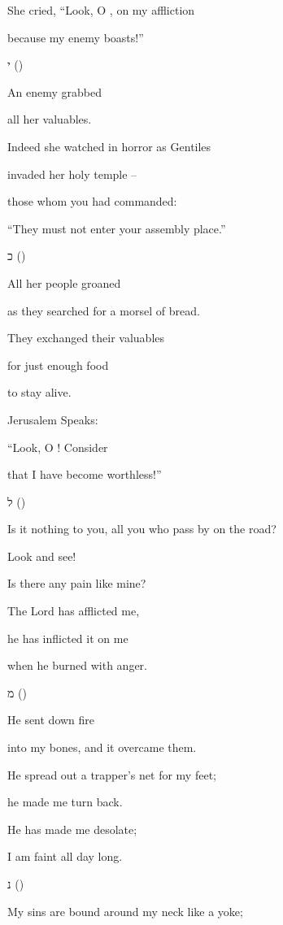 {\par }{\Q She cried, “Look, O
{}, on my affliction
\par }{\Q because my enemy boasts!”
\par }{\SH י ({})
\par }{\Q {}An enemy grabbed
\par }{\Q all her valuables.
\par }{\Q Indeed she watched in horror as Gentiles
\par }{\Q invaded her holy temple –
\par }{\Q those whom you had commanded:
\par }{\Q “They must not enter your assembly place.”
\par }{\SH כ ({})
\par }{\Q {}All her people groaned
\par }{\Q as they searched for a morsel of bread.
\par }{\Q They exchanged their valuables
\par }{\Q for just enough food
\par }{\Q to stay alive.
\par }{\SH Jerusalem Speaks:
\par }{\Q “Look, O
{}! Consider
\par }{\Q that I have become worthless!”
\par }{\SH ל ({})
\par }{\Q {}Is it nothing to you, all you who pass by on the road?
\par }{\Q Look and see!
\par }{\Q Is there any pain like mine?
\par }{\Q The Lord has afflicted me,
\par }{\Q he has inflicted it on me
\par }{\Q when he burned with anger.
\par }{\SH מ ({})
\par }{\Q {}He sent down fire
\par }{\Q into my bones, and it overcame them.
\par }{\Q He spread out a trapper’s net for my feet;
\par }{\Q he made me turn back.
\par }{\Q He has made me desolate;
\par }{\Q I am faint all day long.
\par }{\SH נ ({})
\par }{\Q {}My sins are bound around my neck like a yoke;
}
